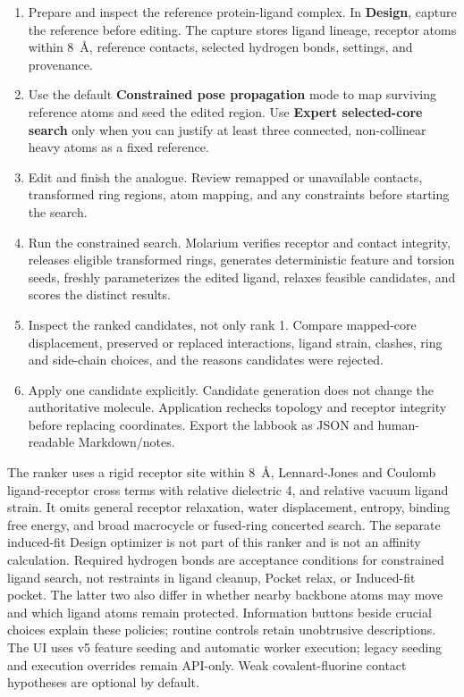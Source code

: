 \documentclass[11pt]{article}
\begin{document}

\begin{enumerate}
\item Prepare and inspect the reference protein-ligand complex. In \textbf{Design}, capture the reference before editing. The capture stores ligand lineage, receptor atoms within 8~\AA, reference contacts, selected hydrogen bonds, settings, and provenance.
\item Use the default \textbf{Constrained pose propagation} mode to map surviving reference atoms and seed the edited region. Use \textbf{Expert selected-core search} only when you can justify at least three connected, non-collinear heavy atoms as a fixed reference.
\item Edit and finish the analogue. Review remapped or unavailable contacts, transformed ring regions, atom mapping, and any constraints before starting the search.
\item Run the constrained search. Molarium verifies receptor and contact integrity, releases eligible transformed rings, generates deterministic feature and torsion seeds, freshly parameterizes the edited ligand, relaxes feasible candidates, and scores the distinct results.
\item Inspect the ranked candidates, not only rank 1. Compare mapped-core displacement, preserved or replaced interactions, ligand strain, clashes, ring and side-chain choices, and the reasons candidates were rejected.
\item Apply one candidate explicitly. Candidate generation does not change the authoritative molecule. Application rechecks topology and receptor integrity before replacing coordinates. Export the labbook as JSON and human-readable Markdown/notes.
\end{enumerate}


The ranker uses a rigid receptor site within 8~\AA, Lennard-Jones and Coulomb ligand-receptor cross terms with relative dielectric 4, and relative vacuum ligand strain. It omits general receptor relaxation, water displacement, entropy, binding free energy, and broad macrocycle or fused-ring concerted search. The separate induced-fit Design optimizer is not part of this ranker and is not an affinity calculation. Required hydrogen bonds are acceptance conditions for constrained ligand search, not restraints in ligand cleanup, Pocket relax, or Induced-fit pocket. The latter two also differ in whether nearby backbone atoms may move and which ligand atoms remain protected. Information buttons beside crucial choices explain these policies; routine controls retain unobtrusive descriptions. The UI uses v5 feature seeding and automatic worker execution; legacy seeding and execution overrides remain API-only. Weak covalent-fluorine contact hypotheses are optional by default.
\end{document}
